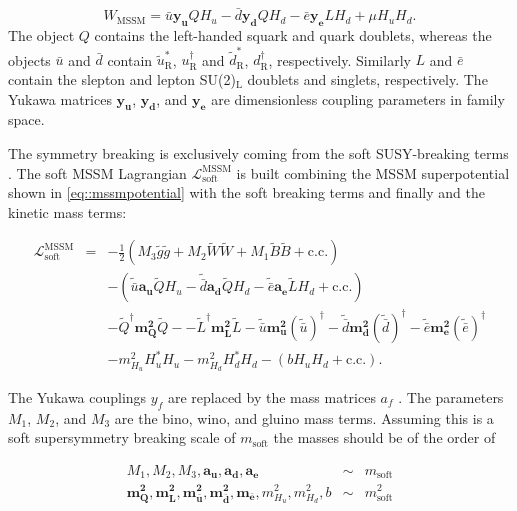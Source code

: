 \begin{equation}
W_{\mathrm{MSSM}} = \bar{u}\mathbf{y_u}QH_u - \bar{d}\mathbf{y_d}QH_d - \bar{e}\mathbf{y_e}LH_d + \mu H_uH_d.
\label{eq::mssmpotential}
\end{equation}
The object $Q$ contains the left-handed squark and quark doublets, whereas the objects $\bar{u}$ and $\bar{d}$ contain $\widetilde{u}^*_{\text{R}}$, ${u}^\dag_{\text{R}}$ and $\widetilde{d}^*_{\text{R}}$, ${d}^\dag_{\text{R}}$, respectively. Similarly $L$ and $\bar{e}$ contain the slepton and lepton SU(2)$_{\mathrm{L}}$ doublets and singlets, respectively. The Yukawa matrices $\mathbf{y_u}$, $\mathbf{y_d}$, and $\mathbf{y_e}$ are dimensionless coupling parameters in family space.

The symmetry breaking is exclusively coming from the soft SUSY-breaking terms \cite{Martin:1997ns}. The soft MSSM Lagrangian $\mathcal{L}_{\mathrm{soft}}^{\mathrm{MSSM}}$ is built combining the MSSM superpotential shown in \autoref{eq::mssmpotential} with the soft breaking terms and finally and the kinetic mass terms\cite{Martin:1997ns}:

\begin{eqnarray}
\mathcal{L}_{\mathrm{soft}}^{\mathrm{MSSM}} &=& -\frac{1}{2}\left(M_3\widetilde{g}\widetilde{g} + M_2 \widetilde{W}\widetilde{W} + M_1\widetilde{B}\widetilde{B} + \mathrm{c.c.}\right)\nonumber\\
& & -\left(\widetilde{\bar{u}}\mathbf{a_u}\widetilde{Q}H_u - \widetilde{\bar{d}}\mathbf{a_d}\widetilde{Q}H_d  - \widetilde{\bar{e}}\mathbf{a_e}\widetilde{L}H_d + \mathrm{c.c.}\right)\nonumber\\
& & -\widetilde{Q}^\dag\mathbf{m_Q^2}\widetilde{Q} - -\widetilde{L}^\dag\mathbf{m_L^2}\widetilde{L} - \widetilde{\bar{u}}\mathbf{m_u^2}(\widetilde{\bar{u}})^\dag - \widetilde{\bar{d}}\mathbf{m_d^2}(\widetilde{\bar{d}})^\dag - \widetilde{\bar{e}}\mathbf{m_e^2}(\widetilde{\bar{e}})^\dag\nonumber\\
& & - m_{H_u}^2H_u^*H_u - m_{H_d}^2H_d^*H_d -(bH_uH_d + \mathrm{c.c.}).
\label{eqn:lmssm_soft}
\end{eqnarray}

The Yukawa couplings $y_{f}$ are replaced by the mass matrices $a_{f}$ \cite{Martin:1997ns}. The parameters $M_1$, $M_2$, and $M_3$ are the bino, wino, and gluino mass terms. Assuming this is a soft supersymmetry breaking scale of $m_{\mathrm{soft}}$ \cite{Martin:1997ns} the masses should be of the order of

\begin{eqnarray}
M_1, M_2, M_3, \mathbf{a_u}, \mathbf{a_d}, \mathbf{a_e} &\sim& m_{\mathrm{soft}}\nonumber\\
\mathbf{m_Q^2}, \mathbf{m_L^2}, \mathbf{m_{\bar{u}}^2}, \mathbf{m_{\bar{d}}^2}, \mathbf{m_{\bar{e}}}, m_{H_u}^2, m_{H_d}^2, b &\sim& m_{\mathrm{soft}}^2
\label{eqn:massscalesmssm}
\end{eqnarray}

